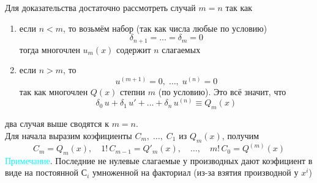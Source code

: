 \begin{Proof}
    Для доказательства достаточно рассмотреть случай $m = n$ так как
    \begin{enumerate}
        \item если $n < m$, то возьмём набор (так как числа любые по условию)
        \[
            \delta_{n+1} = \dots = \delta_{m} = 0    
        \]
        тогда многочлен $u_m(x)$ содержит $n$ слагаемых
        
        \item если $n > m$, то 
        \[
            u^{(m+1)} = 0,\; \dots,\; u^{(n)} = 0
        \]
        так как многочлен $Q(x)$ степни $m$ (по условию). Это всё значит, что
        \[
            \delta_0\,u+\delta_1\,u'+\dots+\delta_n\,u^{(n)} \equiv Q_m(x)
        \]
    \end{enumerate}
    два случая выше сводятся к $m = n$.\\
    Для начала выразим коэфициенты $C_m,\; \dots,\; C_1$ из $Q_m(x)$, получим
    \[
        C_m=Q_m(x),\quad 1!\,C_{m-1}=Q'_m(x),\quad \dots,\quad m!\,C_{0} = Q^{(m)}(x)
    \]
    \textcolor{cyan}{Примечание}. Последние не нулевые слагаемые у производных дают коэфициент в виде на постоянной $С_i$ умноженной на факториал (из-за взятия производной у $x^i$)\\
     

\end{Proof}
